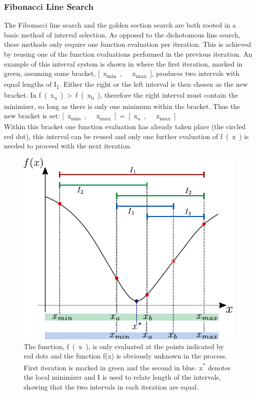 \subsubsection{Fibonacci Line Search}
The Fibonacci line search and the golden section search are both rooted in a basic method of interval selection. As opposed to the dichotomous line search, these methods only require one function evaluation per iteration. This is achieved by reusing one of the function evaluations performed in the previous iteration. An example of this interval system is shown in  where the first iteration, marked in green, assuming some bracket, \si{[x_{min},\ x_{max}]}, produces two intervals with equal lengths of \si{I_1}. Either the right or the left interval is then chosen as the new bracket. In  \si{f(x_a) > f(x_b)}, therefore the right interval must contain the minimizer, so long as there is only one minimum within the bracket. Thus the new bracket is set: \si{[x_{min},\ x_{max}] = \si{[x_{a},\ x_{max}]}}\\
Within this bracket one function evaluation has already taken place (the circled red dot), this interval can be reused and only one further evaluation of \si{f(x)} is needed to proceed with the next iteration.

\begin{figure}[H] 
	\centering
	\includegraphics[width=.6\textwidth]{figures/fibonacciIntervalSystem}
	\caption{The function, \si{f(x)}, is only evaluated at the points indicated by red dots and the function f(x) is obviously unknown in the process. First iteration is marked in green and the second in blue. \si{x^*} denotes the local minimizer and \si{I} is used to relate length of the intervals, showing that the two intervals in each iteration are equal.}
	\label{fibonacciIntervalSystem}
\end{figure}

